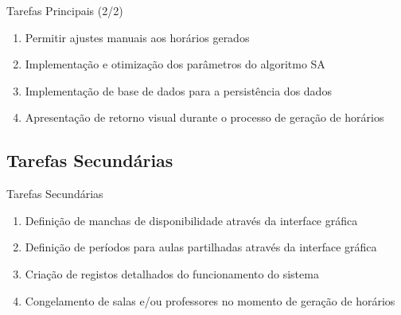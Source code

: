 \documentclass[aspectratio=169]{beamer}
\begin{document}
    \begin{frame}{Tarefas Principais (2/2)}
        \justifying
        \begin{enumerate}
            \setcounter{enumi}{\value{tarefasPrincipais}}

            \item Permitir ajustes manuais aos horários gerados
            \item Implementação e otimização dos parâmetros do algoritmo SA
            \item Implementação de base de dados para a persistência dos dados
            \item Apresentação de retorno visual durante o processo de geração de horários
        \end{enumerate} %
    \end{frame}

    \subsection{Tarefas Secundárias}

    \begin{frame}{Tarefas Secundárias}
        \justifying
        \begin{enumerate}
            \item Definição de manchas de disponibilidade através da interface gráfica
            \item Definição de períodos para aulas partilhadas através da interface gráfica
            \item Criação de registos detalhados do funcionamento do sistema
            \item Congelamento de salas e/ou professores no momento de geração de horários
        \end{enumerate}
    \end{frame}

\end{document}
